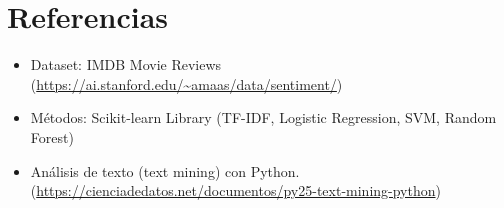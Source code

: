 \documentclass[conference]{IEEEtran}
\begin{document}
\section*{Referencias}

\begin{itemize}
    \item Dataset: IMDB Movie Reviews (\url{https://ai.stanford.edu/~amaas/data/sentiment/})

    \item Métodos: Scikit-learn Library (TF-IDF, Logistic Regression, SVM, Random Forest)

    \item Análisis de texto (text mining) con Python. (\url{https://cienciadedatos.net/documentos/py25-text-mining-python}) 
\end{itemize}
\end{document}
